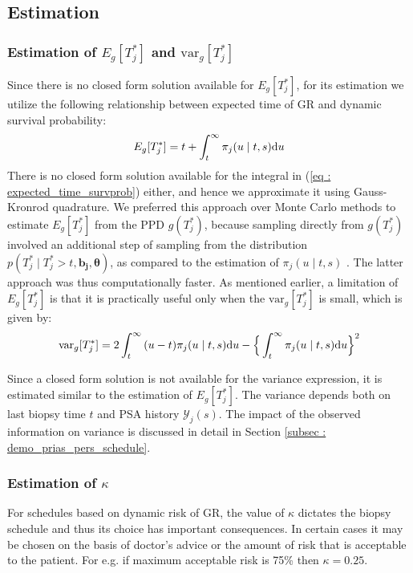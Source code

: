 
\subsection{Estimation}
\subsubsection{Estimation of $E_g[T^*_j]$ and $\mbox{var}_g[T^*_j]$}
Since there is no closed form solution available for $E_g[T^*_j]$, for its estimation we utilize the following relationship between expected time of GR and dynamic survival probability:
\begin{equation}
\label{eq : expected_time_survprob}
E_g[T^*_j] = t + \int_t^\infty \pi_j(u \mid t, s) \rmn{d} u
\end{equation}
There is no closed form solution available for the integral in (\ref{eq : expected_time_survprob}) either, and hence we approximate it using Gauss-Kronrod quadrature. We preferred this approach over Monte Carlo methods to estimate $E_g[T^*_j]$ from the PPD $g(T^*_j)$, because sampling directly from $g(T^*_j)$ involved an additional step of sampling from the distribution $p(T^*_j \mid T^*_j > t, \boldsymbol{b_j}, \boldsymbol{\theta})$, as compared to the estimation of $\pi_j(u \mid t, s)$ \citep{rizopoulos2011dynamic}. The latter approach was thus computationally faster. As mentioned earlier, a limitation of $E_g[T^*_j]$ is that it is practically useful only when the $\mbox{var}_g[T^*_j]$ is small, which is given by:
\begin{equation}
\label{eq : var_time_survprob}
\mbox{var}_g[T^*_j] = 2 \int_t^\infty {(u-t) \pi_j(u \mid t, s) \rmn{d} u} - \Big\{\int_t^\infty \pi_j(u \mid t, s) \rmn{d} u\Big\}^2
\end{equation}

Since a closed form solution is not available for the variance expression, it is estimated similar to the estimation of $E_g[T^*_j]$. The variance depends both on last biopsy time $t$ and PSA history $\mathcal{Y}_j(s)$. The impact of the observed information on variance is discussed in detail in Section \ref{subsec : demo_prias_pers_schedule}.

\subsubsection{Estimation of $\kappa$}
\label{subsubsec : kappa_estimation}
For schedules based on dynamic risk of GR, the value of $\kappa$ dictates the biopsy schedule and thus its choice has important consequences. In certain cases it may be chosen on the basis of doctor's advice or the amount of risk that is acceptable to the patient. For e.g. if maximum acceptable risk is 75\% then $\kappa = 0.25$.

